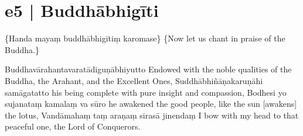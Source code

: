 \section*{e5 | Buddhābhigīti}

\begin{chantsubsection}
  \chantnote
    {\{Handa mayaṃ buddhābhigītiṃ karomase\}}
  \chantnotetrans
    {\{Now let us chant in praise of the Buddha.\}}
\end{chantsubsection}

\begin{chantsubsection}
  \chantline
    {Buddhavārahantavaratādiguṇābhiyutto}
    {Endowed with the noble qualities of the Buddha, the Arahant, and the Excellent Ones,}
  \chantline
    {Suddhābhiñāṇakaruṇāhi samāgatatto}
    {his being complete with pure insight and compassion,}
  \chantline
    {Bodhesi yo sujanataṃ kamalaṃ va sūro}
    {he awakened the good people, like the sun [awakens] the lotus,}
  \chantline
    {Vandāmahaṃ taṃ araṇaṃ sirasā jinendaṃ}
    {I bow with my head to that peaceful one, the Lord of Conquerors.}
\end{chantsubsection}

